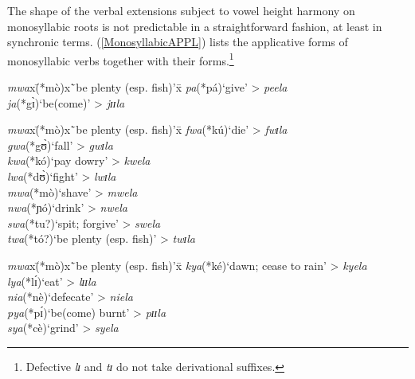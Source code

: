 \label{VHHMonosyllabicVerbs} The shape of the verbal extensions subject to vowel height harmony on monosyllabic roots is not predictable in a straightforward fashion, at least in synchronic terms. (\ref{MonosyllabicAPPL}) lists the applicative forms of monosyllabic verbs together with their  forms.\footnote{Defective \textit{lɪ} and \textit{tɪ} do not take derivational suffixes.} 
\begin{exe} 
\ex
\begin{xlist} \label{MonosyllabicAPPL}
\ex 
\begin{tabbing}
\textit{mwa}x\=(*mò)x\=`be plenty (esp. fish)'x\=\kill%
\textit{pa}\>(*pá)\>`give'\> > \textit{peela}\\
\textit{ja}\>(*gɪ̀)\>`be(come)'\> > \textit{jɪɪla}
\end{tabbing}
\ex \begin{tabbing}
\textit{mwa}x\=(*mò)x\=`be plenty (esp. fish)'x\=\kill%
\textit{fwa}\>(*kú)\>`die'\> > \textit{fwɪla}\\
\textit{gwa}\>(*gʊ̀)\>`fall'\> > \textit{gwɪla}\\
\textit{kwa}\>(*kó)\>`pay dowry'\> > \textit{kwela} \\
\textit{lwa}\>(*dʊ̀)\>`fight'\> > \textit{lwɪla}\\
\textit{mwa}\>(*mò)\>`shave'\> > \textit{mwela}\\
\textit{nwa}\>(*ɲó)\>`drink'\> > \textit{nwela}\\
\textit{swa}\>(*tu?)\>`spit; forgive'\> > \textit{swela}\\
\textit{twa}\>(*tó?)\>`be plenty (esp. fish)'\> > \textit{twɪla}
\end{tabbing}
\ex
\begin{tabbing}
\textit{mwa}x\=(*mò)x\=`be plenty (esp. fish)'x\=\kill%
\textit{kya}\>(*ké)\>`dawn; cease to rain'\> > \textit{kyela}\\
\textit{lya}\>(*lɪ́)\>`eat'\> > \textit{lɪɪla}\\
\textit{nia}\>(*nè)\>`defecate'\> > \textit{niela}\\
\textit{pya}\>(*pɪ́)\>`be(come) burnt'\> > \textit{pɪɪla}\\
\textit{sya}\>(*cè)\>`grind'\> > \textit{syela}
\end{tabbing}
\end{xlist}
\end{exe}

